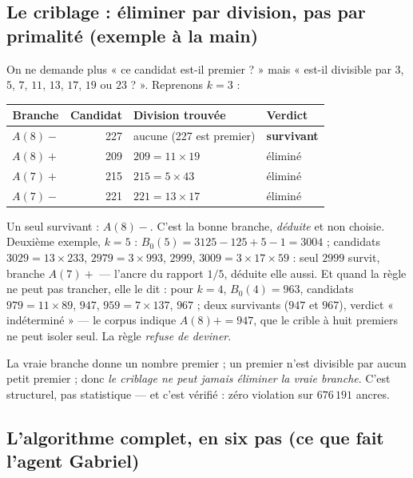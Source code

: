 \documentclass[11pt,a4paper]{article}
\begin{document}
\subsection{Le criblage : éliminer par division, pas par primalité (exemple à la main)}

On ne demande plus « ce candidat est-il premier ? » mais « est-il divisible
par $3$, $5$, $7$, $11$, $13$, $17$, $19$ ou $23$ ? ». Reprenons $k = 3$ :
\begin{center}\small
\begin{tabular}{@{}c r l l@{}}
\toprule
\rowcolor{spectralgris}
Branche & Candidat & Division trouvée & Verdict \\
\midrule
$A(8)-$ & 227 & aucune (227 est premier) & \textbf{survivant} \\
$A(8)+$ & 209 & $209 = 11 \times 19$ & éliminé \\
$A(7)+$ & 215 & $215 = 5 \times 43$ & éliminé \\
$A(7)-$ & 221 & $221 = 13 \times 17$ & éliminé \\
\bottomrule
\end{tabular}
\end{center}
Un seul survivant : $A(8)-$. C'est la bonne branche, \emph{déduite} et non
choisie. Deuxième exemple, $k = 5$ : $B_0(5) = 3125 - 125 + 5 - 1 = 3004$ ;
candidats $3029 = 13 \times 233$, $2979 = 3 \times 993$, $2999$,
$3009 = 3 \times 17 \times 59$ : seul $2999$ survit, branche $A(7)+$ ---
l'ancre du rapport $1/5$, déduite elle aussi. Et quand la règle ne peut pas
trancher, elle le dit : pour $k = 4$, $B_0(4) = 963$, candidats
$979 = 11 \times 89$, $947$, $959 = 7 \times 137$, $967$ ; deux survivants ($947$ et $967$),
verdict « indéterminé » --- le corpus indique $A(8)+ = 947$, que le crible
à huit premiers ne peut isoler seul. La règle \emph{refuse de deviner}.

\vspace{0.3cm}
\begin{boitenote}
La vraie branche donne un nombre premier ; un premier n'est divisible par
aucun petit premier ; donc \emph{le criblage ne peut jamais éliminer la
vraie branche}. C'est structurel, pas statistique --- et c'est vérifié :
zéro violation sur $676\,191$ ancres.
\end{boitenote}


\subsection{L'algorithme complet, en six pas (ce que fait l'agent Gabriel)}
\end{document}
